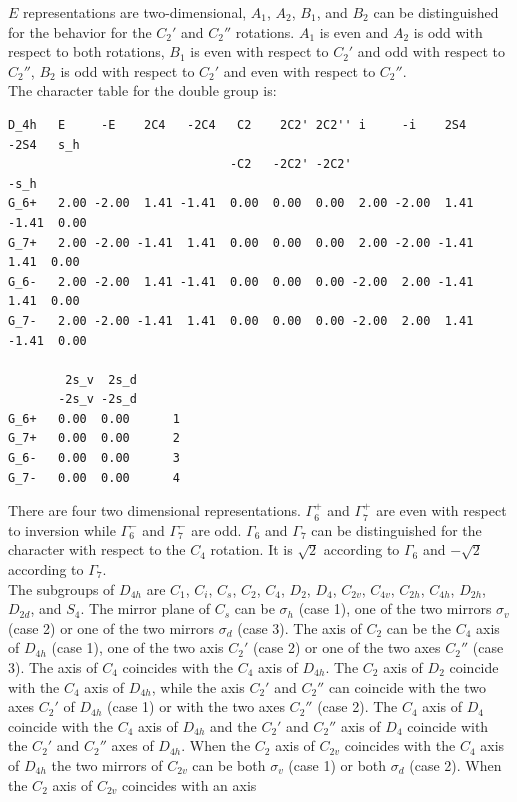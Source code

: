 \documentclass[12pt,a4paper]{article}
\begin{document}
$E$ representations are two-dimensional, $A_1$, $A_2$, $B_1$, and $B_2$ can
be distinguished for the behavior for the $C_2'$ and $C_2''$ rotations.
$A_1$ is even and $A_2$ is odd with respect to both rotations, 
$B_1$ is even with respect to $C_2'$ and odd with respect to $C_2''$,
$B_2$ is odd with respect to $C_2'$ and even with respect to $C_2''$. \\
The character table for the double group is:
\begin{verbatim}
D_4h   E     -E    2C4   -2C4   C2    2C2' 2C2'' i     -i    2S4   -2S4   s_h 
                               -C2   -2C2' -2C2'                         -s_h 
G_6+   2.00 -2.00  1.41 -1.41  0.00  0.00  0.00  2.00 -2.00  1.41 -1.41  0.00
G_7+   2.00 -2.00 -1.41  1.41  0.00  0.00  0.00  2.00 -2.00 -1.41  1.41  0.00
G_6-   2.00 -2.00  1.41 -1.41  0.00  0.00  0.00 -2.00  2.00 -1.41  1.41  0.00
G_7-   2.00 -2.00 -1.41  1.41  0.00  0.00  0.00 -2.00  2.00  1.41 -1.41  0.00

        2s_v  2s_d
       -2s_v -2s_d
G_6+   0.00  0.00      1
G_7+   0.00  0.00      2
G_6-   0.00  0.00      3
G_7-   0.00  0.00      4
\end{verbatim}
There are four two dimensional representations. $\Gamma_6^+$ and $\Gamma_7^+$
are even with respect to inversion while $\Gamma_6^-$ and $\Gamma_7^-$ are 
odd. $\Gamma_6$ and $\Gamma_7$ can be distinguished for the character with
respect to the $C_4$ rotation. It is $\sqrt{2}$ according to $\Gamma_6$ and
$-\sqrt{2}$ according to $\Gamma_7$. \\
The subgroups of $D_{4h}$ are $C_1$, $C_i$, $C_s$, $C_2$, $C_4$, $D_2$, $D_4$,
$C_{2v}$, $C_{4v}$, $C_{2h}$, $C_{4h}$, $D_{2h}$, $D_{2d}$, and $S_4$. 
The mirror plane of $C_s$ can be $\sigma_h$ (case 1), one of the two mirrors 
$\sigma_v$ (case 2) or one of the two mirrors $\sigma_d$ (case 3). 
The axis of $C_2$ can be the $C_4$ axis of $D_{4h}$ (case 1), 
one of the two axis $C_2'$ (case 2) or one of the two axes $C_2''$ (case 3). 
The axis of $C_4$ coincides with the $C_4$ axis of $D_{4h}$. 
The $C_2$ axis of $D_2$ coincide with the $C_4$ axis of $D_{4h}$, while
the axis $C_2'$ and $C_2''$ can coincide with the two axes $C_2'$ of
$D_{4h}$ (case 1) or with the two axes $C_2''$ (case 2).
The $C_4$ axis of $D_4$ coincide with the $C_4$ axis of $D_{4h}$ and
the $C_2'$ and $C_2''$ axis of $D_4$ coincide with the $C_2'$ and $C_2''$ axes
of $D_{4h}$.
When the $C_2$ axis of $C_{2v}$ coincides with the $C_4$ axis
of $D_{4h}$ the two mirrors of $C_{2v}$ can be both $\sigma_v$ (case 1) or 
both $\sigma_d$ (case 2). When the $C_2$ axis of $C_{2v}$ coincides with an axis 
\end{document}
